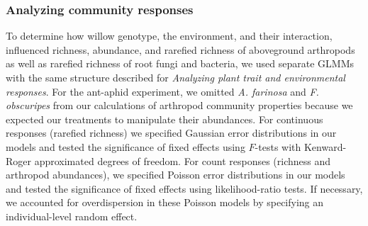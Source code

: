 \documentclass[11pt]{article}
\begin{document}
\subsubsection*{Analyzing community responses}
To determine how willow genotype, the environment, and their
interaction, influenced richness, abundance, and rarefied richness of
aboveground arthropods as well as rarefied richness of root fungi and
bacteria, we used separate GLMMs with the same structure described for \emph{Analyzing plant trait and environmental responses}. %
For the ant-aphid experiment, we omitted
\emph{A. farinosa} and \emph{F. obscuripes} from our calculations of
arthropod community properties because we expected our treatments to
manipulate their abundances. 
For continuous responses (rarefied richness) we specified Gaussian error distributions
in our models and tested the significance of fixed effects using $F$-tests
with Kenward-Roger approximated degrees of freedom. For count responses
(richness and arthropod abundances), we specified Poisson error
distributions in our models and tested the significance of fixed effects
using likelihood-ratio tests. If necessary, we accounted for
overdispersion in these Poisson models by specifying an individual-level
random effect.
\end{document}
